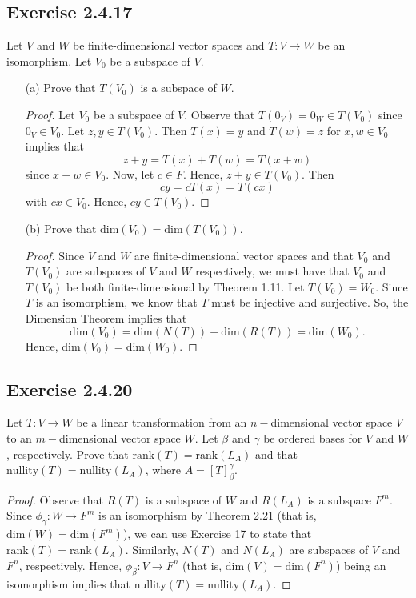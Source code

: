 \subsection*{Exercise 2.4.17} Let \( V  \) and \( W  \) be finite-dimensional vector spaces and \( T: V \to W  \) be an isomorphism. Let \( {V}_{0} \) be a subspace of \( V  \).
\begin{enumerate}
    \item[(a)] Prove that \( T({V}_{0})  \) is a subspace of \( W  \).
        \begin{proof}
            Let \( {V}_{0}  \) be a subspace of \( V \). Observe that \( T({0}_{V}) = {0}_{W} \in T({V}_{0}) \) since \( {0}_{V} \in {V}_{0} \). Let \( z,y \in T({V}_{0}) \). Then \( T(x) = y  \) and \( T(w) = z  \) for \( x,w \in {V}_{0}  \) implies that
            \[  z + y = T(x) + T(w) = T(x+w) \]
            since \( x+w \in {V}_{0} \). Now, let \( c \in F  \). Hence, \( z + y \in T({V}_{0}) \). Then 
            \[  cy = cT(x) = T(cx) \]
            with \( cx \in {V}_{0} \). Hence, \( cy \in T({V}_{0})\).
        \end{proof}
    \item[(b)] Prove that \( \text{dim}({V}_{0}) = \text{dim}(T({V}_{0})) \).
        \begin{proof}
        Since \( V  \) and \( W  \) are finite-dimensional vector spaces and that \( {V}_{0} \) and \( T({V}_{0}) \) are subspaces of \( V  \) and \( W  \) respectively, we must have that \( {V}_{0}\) and \( T({V}_{0}) \) be both finite-dimensional by Theorem 1.11. Let \( T({V}_{0}) = {W}_{0} \). Since \( T  \) is an isomorphism, we know that \( T \) must be injective and surjective. So, the Dimension Theorem implies that   
        \[ \text{dim}({V}_{0}) = \text{dim}(N(T)) + \text{dim}(R(T)) = \text{dim}({W}_{0}).\]
        Hence, \( \text{dim}({V}_{0}) = \text{dim}({W}_{0}) \).
        \end{proof}
\end{enumerate}

\subsection*{Exercise 2.4.20} Let \( T: V \to W  \) be a linear transformation from an \( n- \)dimensional vector space \( V  \) to an \( m- \)dimensional vector space \( W  \). Let \( \beta  \) and \( \gamma  \) be ordered bases for \( V  \) and \( W  \), respectively. Prove that \( \text{rank}(T) = \text{rank}({L}_{A}) \) and that \( \text{nullity}(T) = \text{nullity}({L}_{A}) \), where \( A = [T]_{\beta}^{\gamma}  \). 
\begin{proof}
    Observe that \( R(T)  \) is a subspace of \( W  \) and \( R({L}_{A})  \) is a subspace \( F^{m} \). Since \( {\phi}_{\gamma}: W \to F^{m} \) is an isomorphism by Theorem 2.21 (that is, \( \text{dim}(W) = \text{dim}(F^{m}) \)), we can use Exercise 17 to state that \( \text{rank}(T) = \text{rank}({L}_{A}) \). Similarly, \( N(T)  \) and \( N({L}_{A}) \) are subspaces of \( V  \) and \( F^{n} \), respectively. Hence, \( {\phi}_{\beta}: V \to F^{n} \) (that is, \( \text{dim}(V) = \text{dim}(F^{n}) \)) being an isomorphism implies that \( \text{nullity}(T) = \text{nullity}({L}_{A})\). 
\end{proof}

